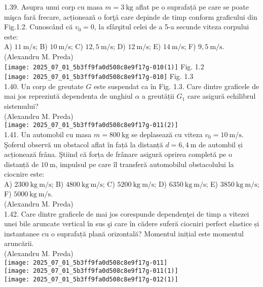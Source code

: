 1.39. Asupra unui corp cu masa $m=3 \mathrm{~kg}$ aflat pe o suprafață pe care se poate mişca fară frecare, acționează o forţă care depinde de timp conform graficului din Fig.1.2. Cunoscând că $v_{0}=0$, la sfârşitul celei de a 5-a secunde viteza corpului este:\\ A) $11 \mathrm{~m} / \mathrm{s}$; B) $10 \mathrm{~m} / \mathrm{s}$; C) $12,5 \mathrm{~m} / \mathrm{s}$; D) $12 \mathrm{~m} / \mathrm{s}$; E) $14 \mathrm{~m} / \mathrm{s}$; F) $9,5 \mathrm{~m} / \mathrm{s}$.\\ (Alexandru M. Preda)\\ \texttt{[image: 2025\_07\_01\_5b3ff9fa0d508c8e9f17g-010(1)]} Fig. 1.2\\ \texttt{[image: 2025\_07\_01\_5b3ff9fa0d508c8e9f17g-010]} Fig. 1.3\\

1.40. Un corp de greutate $G$ este suspendat ca în Fig. 1.3. Care dintre graficele de mai jos reprezintă dependenta de unghiul $\alpha$ a greutății $G_{1}$ care asigură echilibrul sistemului?\\ (Alexandru M. Preda)\\ \texttt{[image: 2025\_07\_01\_5b3ff9fa0d508c8e9f17g-011(2)]}\\

1.41. Un automobil cu masa $m=800 \mathrm{~kg}$ se deplasează cu viteza $v_{0}=10 \mathrm{~m} / \mathrm{s}$. Şoferul observă un obstacol aflat în față la distanță $d=6,4 \mathrm{~m}$ de autombil și acționează frâna. Ştiind că forța de frânare asigură oprirea completă pe o distanță de $10 \mathrm{~m}$, impulsul pe care îl transferă automobilul obstacolului la ciocnire este:\\ A) $2300 \mathrm{~kg} \mathrm{~m} / \mathrm{s}$; B) $4800 \mathrm{~kg} \mathrm{~m} / \mathrm{s}$; C) $5200 \mathrm{~kg} \mathrm{~m} / \mathrm{s}$; D) $6350 \mathrm{~kg} \mathrm{~m} / \mathrm{s}$; E) $3850 \mathrm{~kg} \mathrm{~m} / \mathrm{s}$; F) $5000 \mathrm{~kg} \mathrm{~m} / \mathrm{s}$.\\ (Alexandru M. Preda)\\

1.42. Care dintre graficele de mai jos corespunde dependenţei de timp a vitezei unei bile aruncate vertical în sus şi care în cădere suferă ciocniri perfect elastice și instantanee cu o suprafață plană orizontală? Momentul inițial este momentul aruncării.\\ (Alexandru M. Preda)\\ \texttt{[image: 2025\_07\_01\_5b3ff9fa0d508c8e9f17g-011]}\\ \texttt{[image: 2025\_07\_01\_5b3ff9fa0d508c8e9f17g-011(1)]}\\ \texttt{[image: 2025\_07\_01\_5b3ff9fa0d508c8e9f17g-012(1)]}\\

